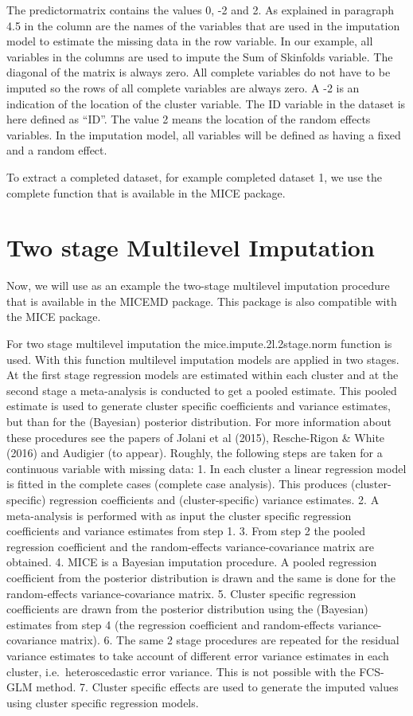 \documentclass[]{book}
\begin{document}
The predictormatrix contains the values 0, -2 and 2. As explained in
paragraph 4.5 in the column are the names of the variables that are used
in the imputation model to estimate the missing data in the row
variable. In our example, all variables in the columns are used to
impute the Sum of Skinfolds variable. The diagonal of the matrix is
always zero. All complete variables do not have to be imputed so the
rows of all complete variables are always zero. A -2 is an indication of
the location of the cluster variable. The ID variable in the dataset is
here defined as ``ID''. The value 2 means the location of the random
effects variables. In the imputation model, all variables will be
defined as having a fixed and a random effect.

To extract a completed dataset, for example completed dataset 1, we use
the complete function that is available in the MICE package.

\section{Two stage Multilevel
Imputation}\label{two-stage-multilevel-imputation}

Now, we will use as an example the two-stage multilevel imputation
procedure that is available in the MICEMD package. This package is also
compatible with the MICE package.

For two stage multilevel imputation the mice.impute.2l.2stage.norm
function is used. With this function multilevel imputation models are
applied in two stages. At the first stage regression models are
estimated within each cluster and at the second stage a meta-analysis is
conducted to get a pooled estimate. This pooled estimate is used to
generate cluster specific coefficients and variance estimates, but than
for the (Bayesian) posterior distribution. For more information about
these procedures see the papers of Jolani et al (2015), Resche-Rigon \&
White (2016) and Audigier (to appear). Roughly, the following steps are
taken for a continuous variable with missing data: 1. In each cluster a
linear regression model is fitted in the complete cases (complete case
analysis). This produces (cluster-specific) regression coefficients and
(cluster-specific) variance estimates. 2. A meta-analysis is performed
with as input the cluster specific regression coefficients and variance
estimates from step 1. 3. From step 2 the pooled regression coefficient
and the random-effects variance-covariance matrix are obtained. 4. MICE
is a Bayesian imputation procedure. A pooled regression coefficient from
the posterior distribution is drawn and the same is done for the
random-effects variance-covariance matrix. 5. Cluster specific
regression coefficients are drawn from the posterior distribution using
the (Bayesian) estimates from step 4 (the regression coefficient and
random-effects variance-covariance matrix). 6. The same 2 stage
procedures are repeated for the residual variance estimates to take
account of different error variance estimates in each cluster,
i.e.~heteroscedastic error variance. This is not possible with the
FCS-GLM method. 7. Cluster specific effects are used to generate the
imputed values using cluster specific regression models.
\end{document}

